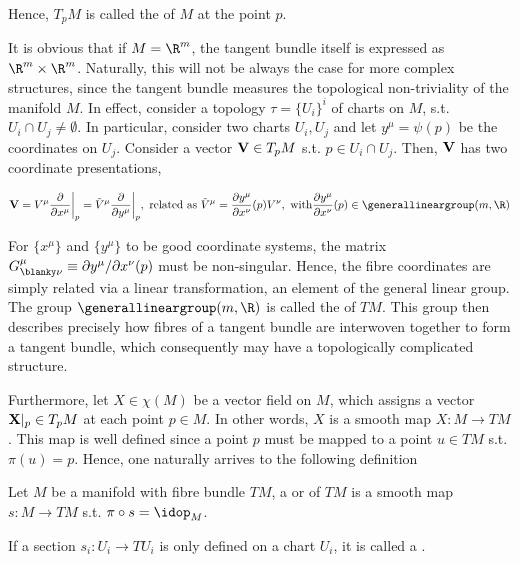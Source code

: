 Hence, $T_pM$ is called the  of $M$ at the point $p$. \medbreak

It is obvious that if $M = \R^m$, the tangent bundle itself is expressed as $\R^m \times \R^m$. Naturally, this will not be always the case for more complex structures, since the tangent bundle measures the topological non-triviality of the manifold $M$. 
In effect, consider a topology $\tau = \{U_i\}^{i}$ of charts on $M$, s.t. $U_i \cap U_j \neq \emptyset$. In particular, consider two charts $U_i, U_j$ and let $y^{\mu} = \psi(p)$ be the coordinates on $U_j$. Consider a vector ${\bf V} \in T_pM$ s.t. $p \in U_i \cap U_j$. Then, ${\bf V}$ has two coordinate presentations,

\begin{equation*}
    {\bf V} = { V}^{\mu} \frac{\partial}{\partial x^{\mu}} \bigg|_{p} 
    = \tilde{{ V}}^{\mu} \frac{\partial}{\partial y^{\mu}} \bigg|_{p}, 
        \textnormal{ related as } 
    \tilde{{ V}}^{\mu} = \frac{\partial y^\mu}{\partial x^\nu}(p) {{V}}^{\nu}, 
        \textnormal{ with} 
    \frac{\partial y^\mu}{\partial x^\nu}(p) \in \generallineargroup(m, \R)
\end{equation*}

For $\{x^\mu\}$ and $\{y^\mu\}$ to be good coordinate systems, the matrix $G^{\mu}_{\blanky \nu} \equiv {\partial y^\mu}/{\partial x^\nu}(p)$ must be non-singular. 
Hence, the fibre coordinates are simply related via a linear transformation, an element of the general linear group. The group $\generallineargroup(m, \R)$ is called the  of $TM$. 
This group then describes precisely how fibres of a tangent bundle are interwoven together to form a tangent bundle, which consequently may have a topologically complicated structure. \medbreak

Furthermore, let $X \in \chi(M)$ be a vector field on $M$, which assigns a vector ${\bf X}|_p \in T_p M$ at each point $p \in M$. 
In other words, $X$ is a smooth map $X : M \rightarrow TM$. This map is well defined since a point $p$ must be mapped to a point $u \in TM$ s.t. $\pi(u) = p$. Hence, one naturally arrives to the following definition

\begin{df}
    Let $M$ be a manifold with fibre bundle $TM$, a  or  of $TM$ is a smooth map $s: M \rightarrow TM$ s.t. $\pi \circ s = \idop_M$. \medbreak

    If a section $s_i: U_i \rightarrow TU_i$ is only defined on a chart $U_i$, it is called a .
\end{df}

